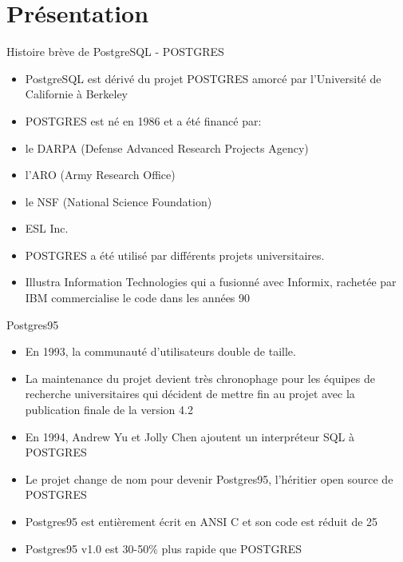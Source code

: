 \section{Présentation}


\begin{frame}[fragile]{Histoire brève de PostgreSQL - POSTGRES}

   \begin{itemize}
      \item PostgreSQL est dérivé du projet POSTGRES amorcé par l'Université de Californie à Berkeley
      \item POSTGRES est né en 1986 et a été financé par:
      \item le DARPA (Defense Advanced Research Projects Agency)
      \item l'ARO (Army Research Office)
      \item le NSF (National Science Foundation)
      \item ESL Inc.
      \item POSTGRES a été utilisé par différents projets universitaires.
      \item Illustra Information Technologies qui a fusionné avec Informix, rachetée par IBM commercialise le code dans les années 90
   \end{itemize}

\begin{toile}
\end{toile}

\end{frame}


\begin{frame}[fragile]{Postgres95}

   \begin{itemize}
      \item En 1993, la communauté d'utilisateurs double de taille.
      \item La maintenance du projet devient très chronophage pour les équipes de recherche universitaires qui décident de mettre fin au projet avec la publication finale de la version 4.2
      \item En 1994, Andrew Yu et Jolly Chen ajoutent un interpréteur SQL à POSTGRES
      \item Le projet change de nom pour devenir Postgres95, l'héritier open source de POSTGRES
      \item Postgres95 est entièrement écrit en ANSI C et son code est réduit de 25%
      \item Postgres95 v1.0 est 30-50\% plus rapide que POSTGRES
   \end{itemize}

\end{frame}

